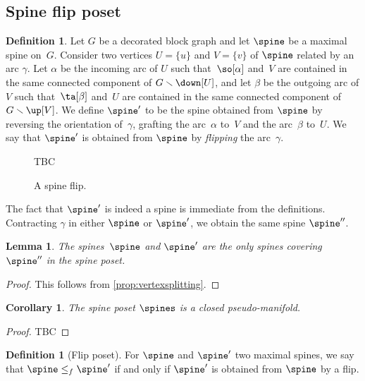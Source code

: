 \documentclass{amsart}
\newtheorem{corollary}[theorem]{Corollary}
\newtheorem{lemma}[theorem]{Lemma}
\theoremstyle{definition}
\newtheorem{definition}[theorem]{Definition}
\newcommand{\ssm}{\smallsetminus} %
\newcommand{\darkblue}{\color{darkblue}} %
\newcommand{\defn}[1]{\textsl{\darkblue #1}} %
\begin{document}

\subsection{Spine flip poset}

\begin{definition}
Let $G$ be a decorated block graph and let $\spine$ be a maximal spine on~$G$.
Consider two vertices $U = \{u\}$ and $V = \{v\}$ of $\spine$ related by an arc $\gamma$. 
Let $\alpha$ be the incoming arc of $U$ such that~$\so[\alpha]$ and~$V$ are contained in the same connected component of $G \ssm \down[U]$, and let $\beta$ be the outgoing arc of $V$ such that~$\ta[\beta]$ and~$U$ are contained in the same connected component of $G \ssm \up[V]$.
We define $\spine'$ to be the spine obtained from $\spine$ by reversing the orientation of~$\gamma$, grafting the arc~$\alpha$ to~$V$ and the arc~$\beta$ to~$U$.
We say that $\spine'$ is obtained from $\spine$ by \defn{flipping} the arc~$\gamma$. 
\end{definition}

\begin{figure}[h!]
  TBC
  \caption{A spine flip.}
\end{figure}

The fact that $\spine'$ is indeed a spine is immediate from the definitions. Contracting $\gamma$ in either $\spine$ or $\spine'$, we obtain the same spine $\spine''$. 

\begin{lemma} 
  \label{lemma:coveringpair} 
  The spines~$\spine$ and $\spine'$ are the only spines covering $\spine''$ in the spine poset.
\end{lemma}

\begin{proof}
  This follows from \cref{prop:vertexsplitting}.
\end{proof}
  
\begin{corollary} 
   The spine poset $\spines$ is a closed pseudo-manifold. 
\end{corollary}

\begin{proof}
  TBC
\end{proof}
  
\begin{definition}[Flip poset] 
  For $\spine$ and $\spine'$ two maximal spines, we say that $\spine \leq_f \spine'$ if and only if $\spine'$ is obtained from $\spine$ by a flip. 
\end{definition}
\end{document}
